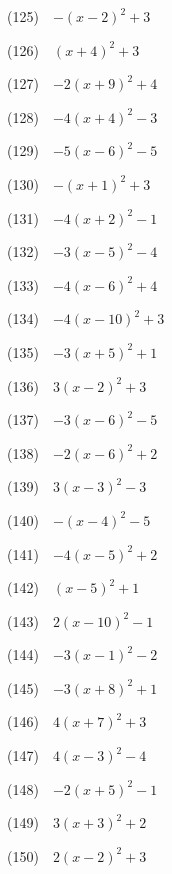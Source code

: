 \documentclass[a4j,twocolumn,10pt,fleqn]{jarticle}
\begin{document}
(125)~~$-(x-2)^2 +3$

(126)~~$(x +4)^2 +3$

(127)~~$-2(x +9)^2 +4$

(128)~~$-4(x +4)^2-3$

(129)~~$-5(x-6)^2-5$

(130)~~$-(x +1)^2 +3$

(131)~~$-4(x +2)^2-1$

(132)~~$-3(x-5)^2-4$

(133)~~$-4(x-6)^2 +4$

(134)~~$-4(x-10)^2 +3$

(135)~~$-3(x +5)^2 +1$

(136)~~$3(x-2)^2 +3$

(137)~~$-3(x-6)^2-5$

(138)~~$-2(x-6)^2 +2$

(139)~~$3(x-3)^2-3$

(140)~~$-(x-4)^2-5$

(141)~~$-4(x-5)^2 +2$

(142)~~$(x-5)^2 +1$

(143)~~$2(x-10)^2-1$

(144)~~$-3(x-1)^2-2$

(145)~~$-3(x +8)^2 +1$

(146)~~$4(x +7)^2 +3$

(147)~~$4(x-3)^2-4$

(148)~~$-2(x +5)^2-1$

(149)~~$3(x +3)^2 +2$

(150)~~$2(x-2)^2 +3$
\end{document}
